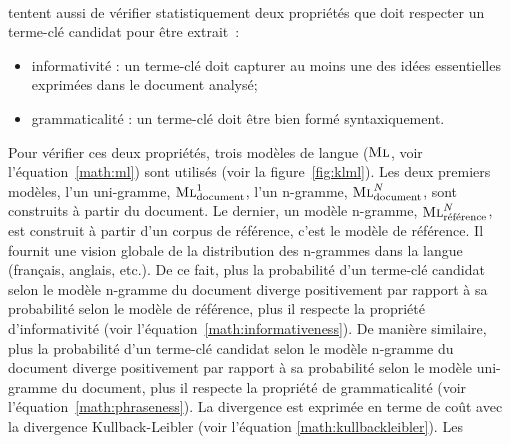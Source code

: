         ~\\ tentent aussi de vérifier
        statistiquement deux propriétés que doit respecter un terme-clé candidat
        pour être extrait~:
        \begin{itemize}
          \item{informativité : un terme-clé doit capturer au moins une des
                idées essentielles exprimées dans le document analysé;}
          \item{grammaticalité : un terme-clé doit être bien formé
                syntaxiquement.}
        \end{itemize}
        Pour vérifier ces deux propriétés, trois modèles de langue
        ($\textsc{Ml}$, voir l'équation~\ref{math:ml}) sont utilisés (voir la
        figure~\ref{fig:klml}). Les deux
        premiers modèles, l'un uni-gramme, $\textsc{Ml}_{\text{document\index{document@Document}}}^1$,
        l'un n-gramme, $\textsc{Ml}_{\text{document\index{document@Document}}}^N$, sont construits à
        partir du document. Le dernier, un modèle n-gramme,
        $\textsc{Ml}_{\text{référence\index{reference@Référence}}}^N$, est construit à partir d'un corpus
        de référence, c'est le modèle de référence. Il fournit une vision
        globale de la distribution des n-grammes dans la langue (français,
        anglais, etc.). De ce fait, plus la probabilité d'un terme-clé candidat
        selon le modèle n-gramme du document diverge positivement par rapport à
        sa probabilité selon le modèle de référence, plus il respecte la
        propriété d'informativité (voir l'équation~\ref{math:informativeness}). De
        manière similaire, plus la probabilité d'un terme-clé candidat selon le
        modèle n-gramme du document diverge positivement par rapport à sa
        probabilité selon le modèle uni-gramme du document, plus il respecte la
        propriété de grammaticalité (voir l'équation~\ref{math:phraseness}). La
        divergence est exprimée en terme de coût avec la divergence
        Kullback-Leibler (voir l'équation \ref{math:kullbackleibler}). Les
